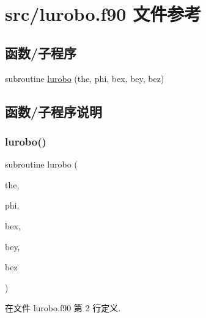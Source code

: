 \hypertarget{lurobo_8f90}{}\section{src/lurobo.f90 文件参考}
\label{lurobo_8f90}
\subsection*{函数/子程序}
\begin{DoxyCompactItemize}
\item 
subroutine \mbox{\hyperlink{lurobo_8f90_a2811f0ff6cdc29a91ae856f5ec644bb5}{lurobo}} (the, phi, bex, bey, bez)
\end{DoxyCompactItemize}


\subsection{函数/子程序说明}
\mbox{\label{lurobo_8f90_a2811f0ff6cdc29a91ae856f5ec644bb5}} 
\subsubsection{\texorpdfstring{lurobo()}{lurobo()}}
{\footnotesize\ttfamily subroutine lurobo (\begin{DoxyParamCaption}\item[{}]{the,  }\item[{}]{phi,  }\item[{}]{bex,  }\item[{}]{bey,  }\item[{}]{bez }\end{DoxyParamCaption})}



在文件 lurobo.\+f90 第 2 行定义.


